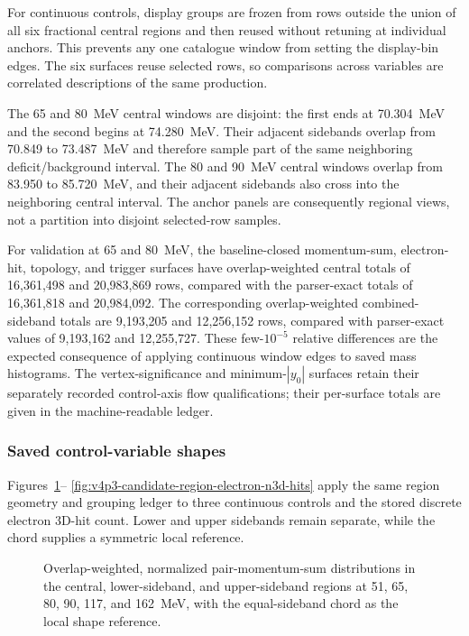 For continuous controls, display groups are frozen from rows outside the
union of all six fractional central regions and then reused without retuning
at individual anchors.  This prevents any one catalogue window from setting
the display-bin edges.  The six surfaces reuse selected rows, so comparisons
across variables are correlated descriptions of the same production.

The 65 and 80~MeV central windows are disjoint: the first ends at
70.304~MeV and the second begins at 74.280~MeV.  Their adjacent sidebands
overlap from 70.849 to 73.487~MeV and therefore sample part of the same
neighboring deficit/background interval.  The 80 and 90~MeV central windows
overlap from 83.950 to 85.720~MeV, and their adjacent sidebands also cross
into the neighboring central interval.  The anchor panels are consequently
regional views, not a partition into disjoint selected-row samples.

For validation at 65 and 80~MeV, the baseline-closed momentum-sum,
electron-hit, topology, and trigger surfaces have overlap-weighted central
totals of 16,361,498 and 20,983,869 rows, compared with the parser-exact
totals of 16,361,818 and 20,984,092.  The corresponding overlap-weighted
combined-sideband totals are 9,193,205 and 12,256,152 rows, compared with
parser-exact values of 9,193,162 and 12,255,727.  These few-$10^{-5}$ relative
differences are the expected consequence of applying continuous window edges
to saved mass histograms.  The vertex-significance and minimum-$|y_0|$
surfaces retain their separately recorded control-axis flow qualifications;
their per-surface totals are given in the machine-readable ledger.

\subsubsection{Saved control-variable shapes}
\label{app:v4p3-candidate-region-continuous}

Figures~\ref{fig:v4p3-candidate-region-psum}--
\ref{fig:v4p3-candidate-region-electron-n3d-hits} apply the same region
geometry and grouping ledger to three continuous controls and the stored
discrete electron 3D-hit count.  Lower and upper sidebands remain separate,
while the chord supplies a symmetric local reference.

\begin{figure}[H]
\centering
{}
\caption{Overlap-weighted, normalized pair-momentum-sum distributions in the
central, lower-sideband, and upper-sideband regions at 51, 65, 80, 90, 117,
and 162~MeV, with the equal-sideband chord as the local shape reference.}
\label{fig:v4p3-candidate-region-psum}
\end{figure}


